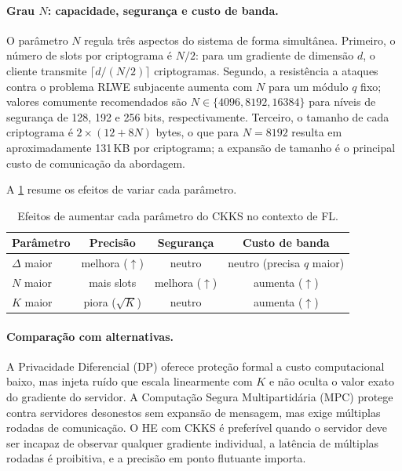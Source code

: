 \documentclass[11pt,a4paper]{article}
\begin{document}
\paragraph{Grau $N$: capacidade, segurança e custo de banda.}
O parâmetro $N$ regula três aspectos do sistema de forma simultânea. Primeiro, o
número de slots por criptograma é $N/2$: para um gradiente de dimensão $d$, o cliente
transmite $\lceil d/(N/2)\rceil$ criptogramas. Segundo, a resistência a ataques contra
o problema RLWE subjacente aumenta com $N$ para um módulo $q$ fixo; valores
comumente recomendados são $N \in \{4096, 8192, 16384\}$ para níveis de segurança de
128, 192 e 256 bits, respectivamente. Terceiro, o tamanho de cada criptograma é
$2 \times (12 + 8N)$ bytes, o que para $N=8192$ resulta em aproximadamente 131\,KB
por criptograma; a expansão de tamanho é o principal custo de comunicação da abordagem.

A \cref{tab:tradeoffs} resume os efeitos de variar cada parâmetro.

\begin{table}[ht]
\centering
\caption{Efeitos de aumentar cada parâmetro do CKKS no contexto de FL.}
\label{tab:tradeoffs}
\small
\begin{tabular}{lccc}
\toprule
\textbf{Parâmetro} & \textbf{Precisão} & \textbf{Segurança} & \textbf{Custo de banda} \\
\midrule
$\Delta$ maior   & melhora ($\uparrow$) & neutro          & neutro (precisa $q$ maior) \\
$N$ maior        & mais slots           & melhora ($\uparrow$) & aumenta ($\uparrow$) \\
$K$ maior        & piora ($\sqrt{K}$)   & neutro           & aumenta ($\uparrow$) \\
\bottomrule
\end{tabular}
\end{table}

\paragraph{Comparação com alternativas.}
A Privacidade Diferencial (DP) oferece proteção formal a custo computacional baixo, mas
injeta ruído que escala linearmente com $K$ e não oculta o valor exato do gradiente
do servidor. A Computação Segura Multipartidária (MPC) protege contra servidores
desonestos sem expansão de mensagem, mas exige múltiplas rodadas de comunicação. O
HE com CKKS é preferível quando o servidor deve ser incapaz de observar qualquer
gradiente individual, a latência de múltiplas rodadas é proibitiva, e a precisão em
ponto flutuante importa.
\end{document}

